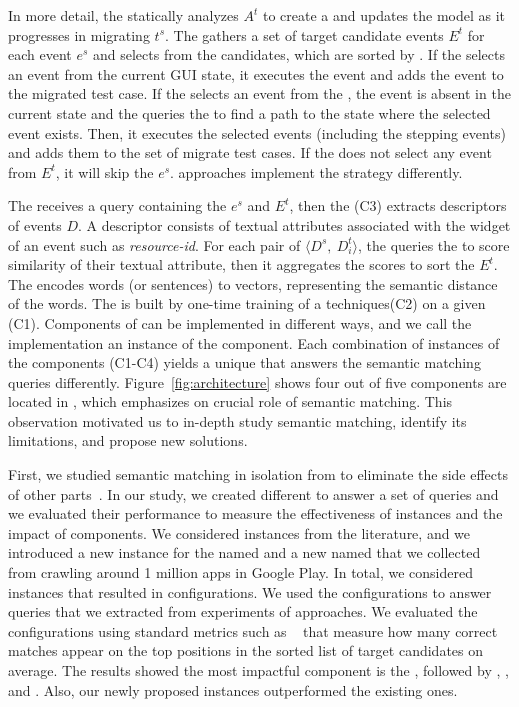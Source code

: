 \bigskip
In more detail, the \generator statically analyzes $A^t$ to create a \tam and updates the model as it progresses in migrating $t^s$.
The \selector gathers a set of target candidate events $E^t$ for each event $e^s$ and selects from the candidates, which are sorted by \matcher.
If the \selector selects an event from the current GUI state, it executes the event and adds the event to the migrated test case.
If the \selector selects an event from the \tam, the event is absent in the current state and the \selector queries the \tam to find a path to the state where the selected event exists.
Then, it executes the selected events (including the stepping events) and adds them to the set of migrate test cases.
If the \selector does not select any event from $E^t$, it will skip the $e^s$.
\testreuse approaches implement the \selector strategy differently.


\bigskip
The \matcher receives a query containing the $e^s$ and $E^t$, then the \ede (C3) extracts descriptors of events $D$.
A descriptor consists of textual attributes associated with the widget of an event such as \textit{resource-id}.
For each pair of $\langle D^s,  ~D_i^t\rangle$, the \sma queries the \wem to score similarity of their textual attribute, then it aggregates the scores to sort the $E^t$.
The \wem encodes words (or sentences) to vectors, representing the semantic distance of the words.
The \wem is built by one-time training of a \we techniques(C2) on a given \corpus (C1). 
Components of \testreuse can be implemented in different ways, and we call the implementation an instance of the component.
Each combination of instances of the \matcher components (C1-C4) yields a unique \smconfig that answers the semantic matching queries differently.
 Figure~\ref{fig:architecture} shows four out of five \testreuse components are located in \matcher, which emphasizes on crucial role of semantic matching.
 This observation motivated us to in-depth study semantic matching, identify its limitations, and propose new solutions. 


\bigskip
 First, we studied semantic matching in isolation from \testreuse to eliminate the side effects of other \testreuse parts~\cite{mariani:SemFinder:ISSTA:2021}.
In our study, we created different \smconfigs to answer  a set of queries and we evaluated their performance to measure the effectiveness of instances and the impact of components.
We considered instances from the literature, and we introduced a new instance for the \sma named \tool and a new \corpus named \gp that we collected from crawling around 1 million apps in Google Play. 
In total, we considered \ninstances instances that resulted in \ncomb configurations.
We used the configurations to answer \nquery queries that we extracted from experiments of \testreuse approaches.
We evaluated the configurations using standard metrics such as \mrr~\cite{liu:MRR:learning:2009} that measure how many correct matches  appear on the top positions in the sorted list of target candidates on average. 
The results showed the most impactful component is the \sma, followed by \we, \ede, and \corpus. 
Also, our newly proposed instances outperformed the existing ones. 



